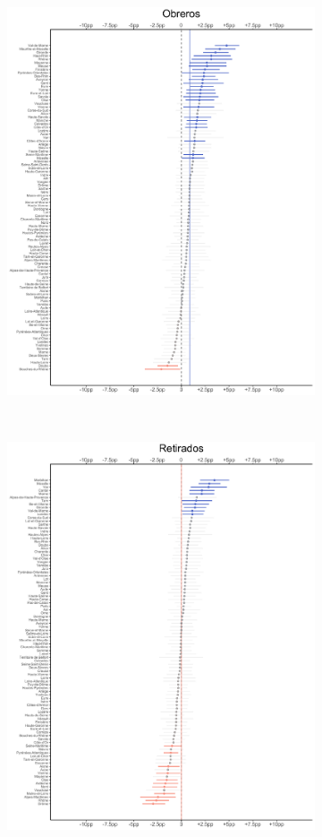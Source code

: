 \begin{figure}
\begin{subfigure}{0.45\textwidth}
	\includegraphics[width = \textwidth]{Figs/Efectos/Efectos_CSP6_Modelo_H}
	\end{subfigure}
	~
	\begin{subfigure}{0.45\textwidth}
	\includegraphics[width = \textwidth]{Figs/Efectos/Efectos_CSP7_Modelo_H}

\end{subfigure}
\end{figure}
